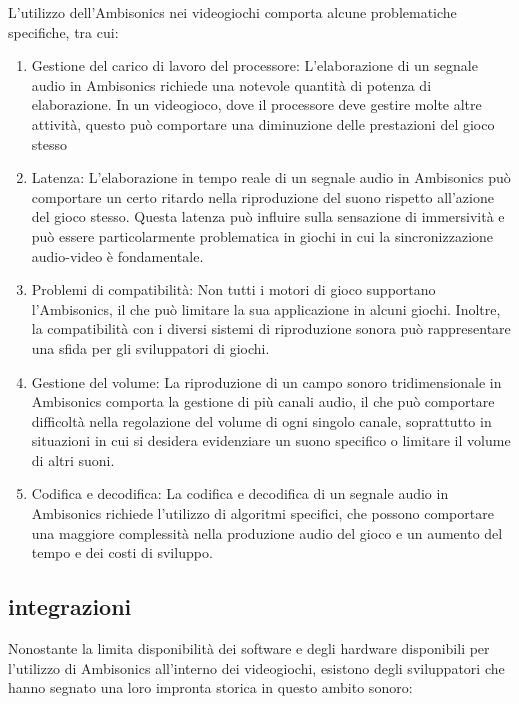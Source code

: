       L'utilizzo dell'Ambisonics nei videogiochi comporta alcune problematiche specifiche, tra cui:

      \begin{enumerate}
            \item Gestione del carico di lavoro del processore:
            L'elaborazione di un segnale audio in Ambisonics richiede una notevole quantità di potenza di elaborazione.
            In un videogioco, dove il processore deve gestire molte altre attività,
            questo può comportare una diminuzione delle prestazioni del gioco stesso
            
            \item Latenza: L'elaborazione in tempo reale di un segnale audio in Ambisonics può comportare un certo ritardo nella riproduzione del suono rispetto all'azione del gioco stesso.
            Questa latenza può influire sulla sensazione di immersività e può essere particolarmente problematica in giochi in cui la sincronizzazione audio-video è fondamentale.
            
\item Problemi di compatibilità: Non tutti i motori di gioco supportano l'Ambisonics, il che può limitare la sua applicazione in alcuni giochi.
Inoltre, la compatibilità con i diversi sistemi di riproduzione sonora può rappresentare una sfida per gli sviluppatori di giochi.

\item Gestione del volume: La riproduzione di un campo sonoro tridimensionale in Ambisonics comporta la gestione di più canali audio, il che può comportare difficoltà nella regolazione del volume di ogni singolo canale, soprattutto in situazioni in cui si desidera evidenziare un suono specifico o limitare il volume di altri suoni.
  
\item Codifica e decodifica: La codifica e decodifica di un segnale audio in Ambisonics richiede l'utilizzo di algoritmi specifici, che possono comportare una maggiore complessità nella produzione audio del gioco e un aumento del tempo e dei costi di sviluppo.

\end{enumerate}

\subsection{integrazioni}

Nonostante la limita disponibilità dei software e degli hardware disponibili per l'utilizzo di Ambisonics all'interno
dei videogiochi, esistono degli sviluppatori che hanno segnato una loro impronta storica in questo ambito sonoro:

